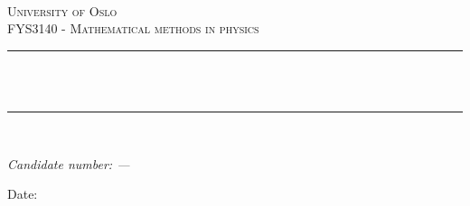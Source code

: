 \begin{titlepage}

\newcommand{\HRule}{\rule{\linewidth}{0.5mm}} %




\begin{center} %

\textsc{\LARGE \reporttype}\\[1.5cm]
\textsc{\Large University of Oslo}\\[0.5cm]
\textsc{\large FYS3140 - Mathematical methods in physics}\\[0.5cm]

\HRule \\[0.4cm]
{ \huge \bfseries \reporttitle}\\ %
\HRule \\[1.5cm]
\end{center}

\begin{flushleft} \large
\textit{Candidate number: ---}\\
\end{flushleft}
\vspace{2cm}
\makeatletter
Date: \@date

\vfill %



\makeatother


\end{titlepage}

